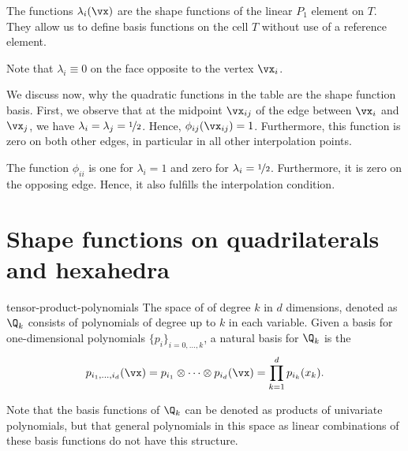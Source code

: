 \begin{example}
  The functions $\lambda_i(\vx)$ are the shape functions of the linear
  $P_1$ element on $T$. They allow us to define basis functions on the
  cell $T$ without use of a reference element.

  Note that $\lambda_i\equiv 0$ on the face opposite to the
  vertex $\vx_i$.
  
  We discuss now, why the quadratic functions in the table are the
  shape function basis. First, we observe that at the midpoint
  $\vx_{ij}$ of the edge between $\vx_i$ and $\vx_j$, we have
  $\lambda_i = \lambda_j = \nicefrac12$. Hence,
  $\phi_{ij}(\vx_{ij}) = 1$. Furthermore, this function is zero on
  both other edges, in particular in all other interpolation points.

  The function $\phi_{ii}$ is one for $\lambda_i = 1$ and zero for
  $\lambda_i=\nicefrac12$. Furthermore, it is zero on the opposing
  edge. Hence, it also fulfills the interpolation condition.
\end{example}

\section{Shape functions on quadrilaterals and hexahedra}

\begin{Definition}{tensor-product-polynomials}
  The space of  of degree $k$ in
  $d$ dimensions, denoted as $\Q_k$ consists of polynomials of degree
  up to $k$ in each variable. Given a basis for one-dimensional
  polynomials $\{p_i\}_{i=0,\dots,k}$, a natural basis for $\Q_k$ is
  the 
  \begin{gather}
    \label{eq:fem-intro:1}
    p_{i_1,\dots,i_d}(\vx)
    = p_{i_1}\otimes \dots\otimes p_{i_d}(\vx)
    = \prod_{k=1}^d p_{i_k}(x_k).
  \end{gather}
\end{Definition}

\begin{remark}
  Note that the basis functions of $\Q_k$ can be denoted as products
  of univariate polynomials, but that general polynomials in this
  space as linear combinations of these basis functions do not have
  this structure.
\end{remark}

